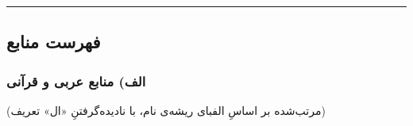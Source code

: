 \begin{RTL}
\begin{otherlanguage}{persian}
\begin{center}\rule{0.5\linewidth}{0.5pt}\end{center}

\subsection{فهرست
منابع}\label{ux641ux647ux631ux633ux62a-ux645ux646ux627ux628ux639}

\subsubsection{الف) منابع عربی و
قرآنی}\label{ux627ux644ux641-ux645ux646ux627ux628ux639-ux639ux631ux628ux6cc-ux648-ux642ux631ux622ux646ux6cc}

(مرتب‌شده بر اساسِ الفبای ریشه‌ی نام، با نادیده‌گرفتنِ «ال» تعریف)


\end{otherlanguage}
\end{RTL}
